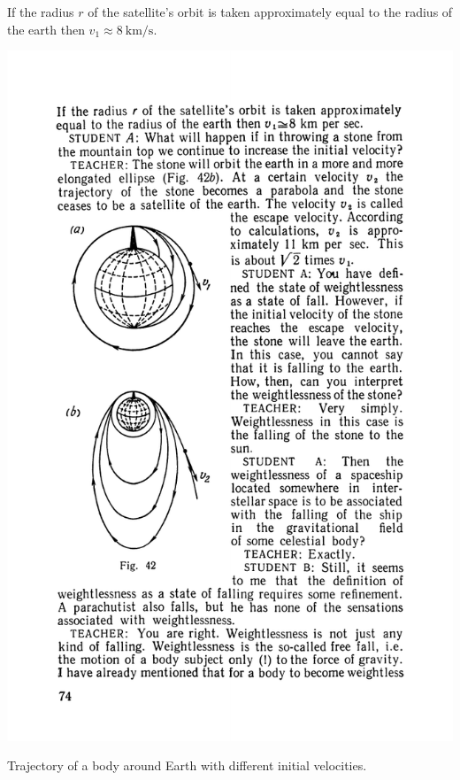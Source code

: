 \documentclass[a4paper,sfsidenotes]{tufte-book}
\begin{document}
If the radius $r$ of the satellite's orbit is taken approximately equal to the radius of the earth then $v_{1} \approx \SI[per-mode=symbol]{8}{\kilo\metre\per\second}$.
\\
\begin{marginfigure}%
\centering
\includegraphics[width=\linewidth]{fig-042a.pdf}
\caption{Trajectory of a body around Earth with different initial velocities.}
\label{fig-42}
\end{marginfigure}
\end{document}
